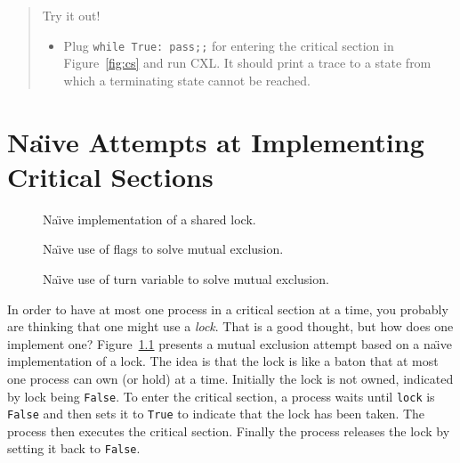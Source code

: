 \documentclass{report}
\newenvironment{code}{
\tcolorbox
}{
\endtcolorbox
}
\begin{document}
\begin{quote}
Try it out!
\begin{itemize}
\item Plug \texttt{while True: pass;;} for entering the critical section
in Figure~\ref{fig:cs} and run CXL.  It should print a trace
to a state from which a terminating state cannot be reached.
\end{itemize}
\end{quote}


\chapter{Na\"{\i}ve Attempts at Implementing Critical Sections}

\begin{figure}
\begin{code}

\end{code}
\caption{Na\"{\i}ve implementation of a shared lock.}
\label{fig:uplock}
\end{figure}

\begin{figure}
\begin{code}

\end{code}
\caption{Na\"{\i}ve use of flags to solve mutual exclusion.}
\label{fig:upflags}
\end{figure}

\begin{figure}
\begin{code}

\end{code}
\caption{Na\"{\i}ve use of turn variable to solve mutual exclusion.}
\label{fig:upturn}
\end{figure}

In order to have at most one process in a critical section at a time, you
probably are thinking that one might use a \emph{lock}.
That is a good thought, but how does one implement one?
Figure~\ref{fig:uplock} presents a mutual exclusion attempt based on a
na\"{\i}ve implementation of a lock.
The idea is that the lock is like a baton that at most one process can own
(or hold) at a time.
Initially the lock is not owned, indicated by lock being \texttt{False}.
To enter the critical section, a process waits until \texttt{lock} is \texttt{False}
and then sets it to \texttt{True} to indicate that the lock has been taken.
The process then executes the critical section.  Finally the process
releases the lock by setting it back to \texttt{False}.
\end{document}
